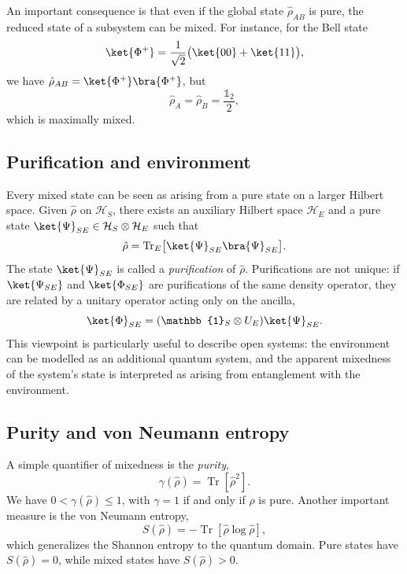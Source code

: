 An important consequence is that even if the global state $\hat{\rho}_{AB}$ is pure, the reduced state of a subsystem can be mixed. 
For instance, for the Bell state
\begin{equation}
	\ket{\Phi^+} = \frac{1}{\sqrt{2}}\bigl(\ket{00} + \ket{11}\bigr),
\end{equation}
we have $\hat{\rho}_{AB} = \ket{\Phi^+}\bra{\Phi^+}$, but
\begin{equation}
	\hat{\rho}_A = \hat{\rho}_B = \frac{\mathbb{1}_2}{2},
\end{equation}
which is maximally mixed.

\subsection{Purification and environment}

Every mixed state can be seen as arising from a pure state on a larger Hilbert space. 
Given $\hat{\rho}$ on $\mathcal{H}_S$, there exists an auxiliary Hilbert space $\mathcal{H}_E$ and a pure state $\ket{\Psi}_{SE} \in \mathcal{H}_S \otimes \mathcal{H}_E$ such that
\begin{equation}
	\hat{\rho} = \operatorname{Tr}_E \bigl[\ket{\Psi}_{SE}\bra{\Psi}_{SE}\bigr].
\end{equation}
The state $\ket{\Psi}_{SE}$ is called a \emph{purification} of $\hat{\rho}$. 
Purifications are not unique: if $\ket{\Psi_{SE}}$ and $\ket{\Phi_{SE}}$ are purifications of the same density operator, they are related by a unitary operator acting only on the ancilla,
\begin{equation}
	\ket{\Phi}_{SE} = (\mathbb{1}_S \otimes U_E) \ket{\Psi}_{SE}.
\end{equation}
This viewpoint is particularly useful to describe open systems: the environment can be modelled as an additional quantum system, and the apparent mixedness of the system's state is interpreted as arising from entanglement with the environment.

\subsection{Purity and von Neumann entropy}

A simple quantifier of mixedness is the \emph{purity},
\begin{equation}
	\gamma(\hat{\rho}) = \operatorname{Tr}[\hat{\rho}^2].
\end{equation}
We have $0 < \gamma(\hat{\rho}) \leq 1$, with $\gamma = 1$ if and only if $\hat{\rho}$ is pure. 
Another important measure is the von Neumann entropy,
\begin{equation}
	S(\hat{\rho}) = - \operatorname{Tr}[\hat{\rho} \log \hat{\rho}],
\end{equation}
which generalizes the Shannon entropy to the quantum domain. 
Pure states have $S(\hat{\rho}) = 0$, while mixed states have $S(\hat{\rho}) > 0$.

